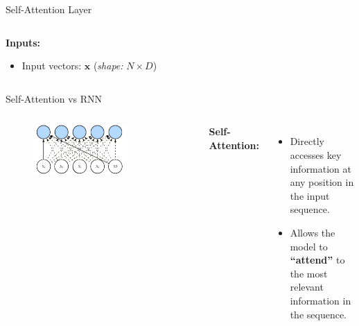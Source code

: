 \documentclass[serif, aspectratio=169]{beamer}
\begin{document}
\begin{frame}{Self-Attention Layer}
\begin{columns}
\begin{column}{0.58\textwidth}
			\textbf{Inputs:}
			\begin{itemize}
				\item Input vectors: $\mathbf{x}$ (\textit{shape: } $N \times D$)
			\end{itemize}
		\end{column}

	\end{columns}
\end{frame}


\begin{frame}{Self-Attention vs RNN}
	
	\begin{columns}
		 \begin{figure}
			\centering
			\includegraphics[width=0.7\textwidth]{pic/self-attention--1.jpg}
		\end{figure}
		\textbf{Self-Attention:}
		\begin{itemize}
			\item Directly accesses key information at any position in the input sequence.
			\item Allows the model to \textbf{``attend''} to the most relevant information in the sequence.
		\end{itemize}
		

\end{columns}
\end{frame}
\end{document}
